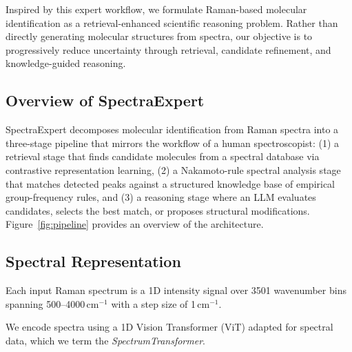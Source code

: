 \documentclass[conference]{IEEEtran}
\begin{document}
Inspired by this expert workflow, we formulate Raman-based molecular identification as a retrieval-enhanced scientific reasoning problem. Rather than directly generating molecular structures from spectra, our objective is to progressively reduce uncertainty through retrieval, candidate refinement, and knowledge-guided reasoning.





\subsection{Overview of SpectraExpert}

SpectraExpert decomposes molecular identification from Raman spectra into a three-stage pipeline that mirrors the workflow of a human spectroscopist: (1) a retrieval stage that finds candidate molecules from a spectral database via contrastive representation learning, (2) a Nakamoto-rule spectral analysis stage that matches detected peaks against a structured knowledge base of empirical group-frequency rules, and (3) a reasoning stage where an LLM evaluates candidates, selects the best match, or proposes structural modifications. Figure~\ref{fig:pipeline} provides an overview of the architecture.





\subsection{Spectral Representation}

Each input Raman spectrum is a 1D intensity signal over 3501 wavenumber bins spanning 500--4000\,cm$^{-1}$ with a step size of 1\,cm$^{-1}$.

We encode spectra using a 1D Vision Transformer (ViT) adapted for spectral data, which we term the \textit{SpectrumTransformer}.
\end{document}
